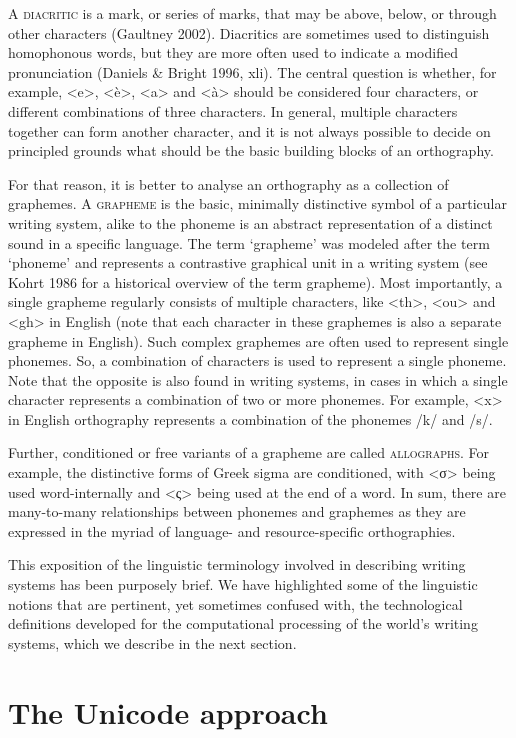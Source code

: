 A \textsc{diacritic} is a mark, or series of marks, that may be above, below, or through other characters (Gaultney 2002). Diacritics are sometimes used to distinguish homophonous words, but they are more often used to indicate a modified pronunciation (Daniels \& Bright 1996, xli). The central question is whether, for example, <e>, <è>, <a> and <à> should be considered four characters, or different combinations of three characters. In general, multiple characters together can form another character, and it is not always possible to decide on principled grounds what should be the basic building blocks of an orthography.

For that reason, it is better to analyse an orthography as a collection of graphemes. A \textsc{grapheme} is the basic, minimally distinctive symbol of a particular writing system, alike to the phoneme is an abstract representation of a distinct sound in a specific language. The term `grapheme' was modeled after the term `phoneme' and represents a contrastive graphical unit in a writing system (see Kohrt 1986 for a historical overview of the term grapheme). Most importantly, a single grapheme regularly consists of multiple characters, like <th>, <ou> and <gh> in English (note that each character in these graphemes is also a separate grapheme in English). Such complex graphemes are often used to represent single phonemes. So, a combination of characters is used to represent a single phoneme. Note that the opposite is also found in writing systems, in cases in which a single character represents a combination of two or more phonemes. For example, <x> in English orthography represents a combination of the phonemes /k/ and /s/. 

Further, conditioned or free variants of a grapheme are called \textsc{allographs}. For example, the distinctive forms of Greek sigma are conditioned, with <σ> being used word-internally and <ς> being used at the end of a word. In sum, there are many-to-many relationships between phonemes and graphemes as they are expressed in the myriad of language- and resource-specific orthographies.

This exposition of the linguistic terminology involved in describing writing systems has been purposely brief. We have highlighted some of the linguistic notions that are pertinent, yet sometimes confused with, the technological definitions developed for the computational processing of the world's writing systems, which we describe in the next section.

\section{The Unicode approach}
\label{the-unicode-approach}

